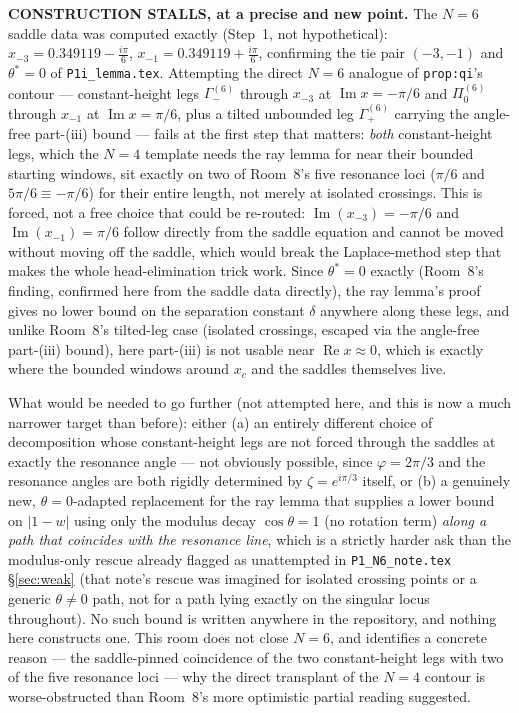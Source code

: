 \documentclass[11pt]{article}
\begin{document}
\textbf{CONSTRUCTION STALLS, at a precise and new point.} The $N=6$ saddle data was computed exactly
(Step~1, not hypothetical): $x_{-3}=0.349119-\frac{i\pi}6$, $x_{-1}=0.349119+\frac{i\pi}6$, confirming
the tie pair $(-3,-1)$ and $\theta^\ast=0$ of \texttt{P1i\_lemma.tex}. Attempting the direct $N=6$
analogue of \texttt{prop:qi}'s contour --- constant-height legs $\Gamma_-^{(6)}$ through $x_{-3}$ at
$\operatorname{Im}x=-\pi/6$ and $\Pi_0^{(6)}$ through $x_{-1}$ at $\operatorname{Im}x=\pi/6$, plus a
tilted unbounded leg $\Gamma_+^{(6)}$ carrying the angle-free part-(iii) bound --- fails at the first
step that matters: \emph{both} constant-height legs, which the $N=4$ template needs the ray lemma for
near their bounded starting windows, sit exactly on two of Room~8's five resonance loci ($\pi/6$ and
$5\pi/6\equiv-\pi/6$) for their entire length, not merely at isolated crossings. This is forced, not a
free choice that could be re-routed: $\operatorname{Im}(x_{-3})=-\pi/6$ and $\operatorname{Im}(x_{-1})=
\pi/6$ follow directly from the saddle equation and cannot be moved without moving off the saddle,
which would break the Laplace-method step that makes the whole head-elimination trick work. Since
$\theta^\ast=0$ exactly (Room~8's finding, confirmed here from the saddle data directly), the ray
lemma's proof gives no lower bound on the separation constant $\delta$ anywhere along these legs, and
unlike Room~8's tilted-leg case (isolated crossings, escaped via the angle-free part-(iii) bound),
here part-(iii) is not usable near $\operatorname{Re}x\approx0$, which is exactly where the bounded
windows around $x_c$ and the saddles themselves live.

What would be needed to go further (not attempted here, and this is now a much narrower target than
before): either (a) an entirely different choice of decomposition whose constant-height legs are not
forced through the saddles at exactly the resonance angle --- not obviously possible, since $\varphi=
2\pi/3$ and the resonance angles are both rigidly determined by $\zeta=e^{i\pi/3}$ itself, or (b) a
genuinely new, $\theta=0$-adapted replacement for the ray lemma that supplies a lower bound on
$|1-w|$ using only the modulus decay $\cos\theta=1$ (no rotation term) \emph{along a path that
coincides with the resonance line}, which is a strictly harder ask than the modulus-only rescue
already flagged as unattempted in \texttt{P1\_N6\_note.tex} \S\ref{sec:weak} (that note's rescue was
imagined for isolated crossing points or a generic $\theta\ne0$ path, not for a path lying exactly on
the singular locus throughout). No such bound is written anywhere in the repository, and nothing here
constructs one. This room does not close $N=6$, and identifies a concrete reason --- the saddle-pinned
coincidence of the two constant-height legs with two of the five resonance loci --- why the direct
transplant of the $N=4$ contour is worse-obstructed than Room~8's more optimistic partial reading
suggested.
\end{document}
